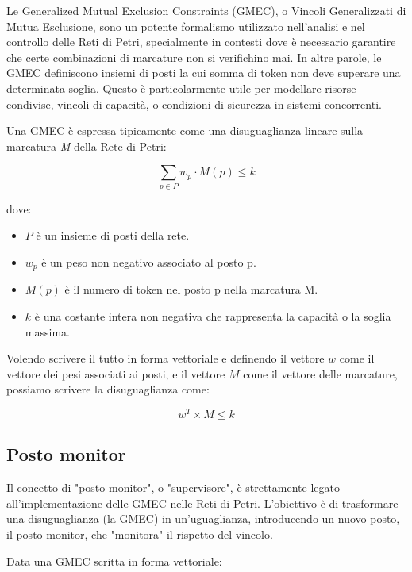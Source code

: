 Le Generalized Mutual Exclusion Constraints (GMEC), o Vincoli Generalizzati di Mutua Esclusione, sono un potente formalismo utilizzato nell'analisi e nel controllo delle Reti di Petri, specialmente in contesti dove è necessario garantire che certe combinazioni di marcature non si verifichino mai. In altre parole, le GMEC definiscono insiemi di posti la cui somma di token non deve superare una determinata soglia. Questo è particolarmente utile per modellare risorse condivise, vincoli di capacità, o condizioni di sicurezza in sistemi concorrenti.

Una GMEC è espressa tipicamente come una disuguaglianza lineare sulla marcatura \textit{M} della Rete di Petri:

\begin{equation}
    \sum_{p \in P} w_{p} \cdot M(p) \leq k
\end{equation}

dove:

\begin{itemize}
    \item $P$ è un insieme di posti della rete.
    \item $w_{p}$ è un peso non negativo associato al posto p.
    \item $M(p)$ è il numero di token nel posto p nella marcatura M.
    \item $k$ è una costante intera non negativa che rappresenta la capacità o la soglia massima.
\end{itemize}

Volendo scrivere il tutto in forma vettoriale e definendo il vettore $w$ come il vettore dei pesi associati ai posti, e il vettore $M$ come il vettore delle marcature, possiamo scrivere la disuguaglianza come:

\begin{equation}
    w^{T} \times M \leq k
\end{equation}

\subsection{Posto monitor}
Il concetto di "posto monitor", o "supervisore", è strettamente legato all'implementazione delle GMEC nelle Reti di Petri. L'obiettivo è di trasformare una disuguaglianza (la GMEC) in un'uguaglianza, introducendo un nuovo posto, il posto monitor, che "monitora" il rispetto del vincolo.

Data una GMEC scritta in forma vettoriale:

